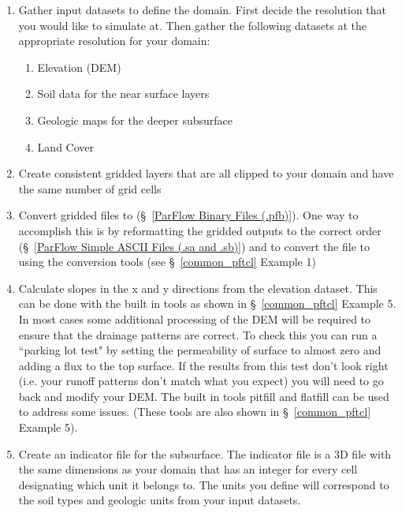 \begin{enumerate}
   \item Gather input datasets to define the domain. First decide the resolution that you 
   would like to simulate at. Then gather the following datasets at the appropriate resolution 
   for your domain:
   \begin{enumerate}
		\item Elevation (DEM)
	    \item Soil data for the near surface layers 
	    \item Geologic maps for the deeper subsurface
	    \item Land Cover
	\end{enumerate}
	
   \item Create consistent gridded layers that are all clipped to your domain and have 
  the same number of grid cells

   \item Convert gridded files to  (\S~\ref{ParFlow Binary Files (.pfb)}). One way 
   to accomplish this is by reformatting the gridded outputs to the correct \parflow{}
    order (\S~\ref{ParFlow Simple ASCII Files (.sa and .sb)}) and to convert
   the  file to  using the conversion tools (see \S~\ref{common_pftcl}
   Example 1)
  
   \item Calculate slopes in the x and y directions from the elevation dataset. This can be 
   done with the built in tools as shown in \S~\ref{common_pftcl} Example 5. 
   In most cases some additional processing of  the DEM will be required to ensure that 
   the drainage patterns are correct. To check this  you  can run a ``parking lot test" by 
   setting the permeability of surface to almost zero and adding a flux to the top surface.
   If the results from this test don't look right (i.e. your runoff patterns don't match 
   what you expect) you will need to go back and modify your DEM.  The built in \parflow{}
   tools pitfill and flatfill can be used to address some issues. 
   (These tools are also shown in \S~\ref{common_pftcl} Example 5). 

   \item Create an indicator file for the subsurface. The indicator file is a 3D  
   file with the same dimensions as your domain that has an integer for every cell 
   designating which unit it belongs to. The units you define will correspond to the soil 
   types and geologic units from your input datasets. 


\end{enumerate}

